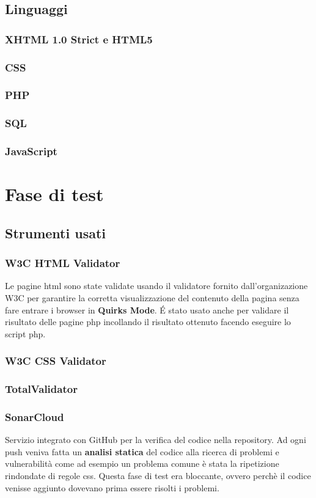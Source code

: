 \documentclass{article}
\begin{document}
		\subsection{Linguaggi}
			\subsubsection{XHTML 1.0 Strict e HTML5}
			\subsubsection{CSS}
			\subsubsection{PHP}
			\subsubsection{SQL}
			\subsubsection{JavaScript}
	\section{Fase di test}
		\subsection{Strumenti usati}
			\subsubsection{W3C HTML Validator}
				Le pagine html sono state validate usando il validatore fornito dall'organizazione W3C per garantire la corretta visualizzazione del contenuto della pagina senza fare entrare i browser in {\bfseries Quirks Mode}. \'E stato usato anche per validare il risultato delle pagine php incollando il risultato ottenuto facendo eseguire lo script php.
			\subsubsection{W3C CSS Validator}
			\subsubsection{TotalValidator}
			\subsubsection{SonarCloud}
				Servizio integrato con GitHub per la verifica del codice nella repository. Ad ogni push veniva fatta un {\bfseries analisi statica} del codice alla ricerca di problemi e vulnerabilità come ad esempio un problema comune è stata la ripetizione rindondate di regole css. Questa fase di test era bloccante, ovvero perchè il codice venisse aggiunto dovevano prima essere risolti i problemi.
\end{document}
